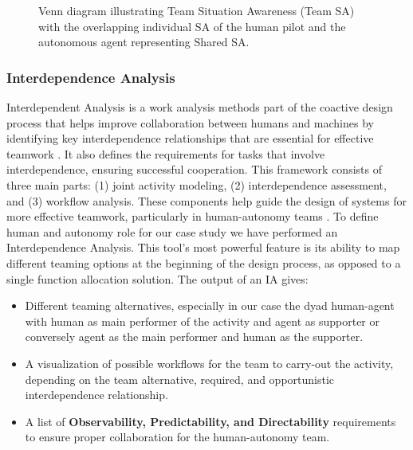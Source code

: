\documentclass[12pt,a4paper]{article} %
\begin{document}
	\begin{figure}[h!]
		\centering
		\caption{Venn diagram illustrating Team Situation Awareness (Team SA) with the overlapping individual SA of the human pilot and the autonomous agent representing Shared SA.}
		\label{fig:team-sa-venn}
	\end{figure}

	\subsubsection{Interdependence Analysis}
	Interdependent Analysis is a work analysis methods part of the coactive design process that helps improve collaboration between humans and machines by identifying key interdependence relationships that are essential for effective teamwork \parencite{johnson_coactive_2014}. It also defines the requirements for tasks that involve interdependence, ensuring successful cooperation. This framework consists of three main parts: (1) joint activity modeling, (2) interdependence assessment, and (3) workflow analysis. These components help guide the design of systems for more effective teamwork, particularly in human-autonomy teams \parencite{johnson_understanding_2018}.
	To define human and autonomy role for our case study we have performed an Interdependence Analysis. This tool's most powerful feature is its ability to map different teaming options at the beginning of the design process, as opposed to a single function allocation solution. The output of an IA gives:
	\begin{itemize}
		\item Different teaming alternatives, especially in our case the dyad human-agent with human as main performer of the activity and agent as supporter or conversely agent as the main performer and human as the supporter.
		\item A visualization of possible workflows for the team to carry-out the activity, depending on the team alternative, required, and opportunistic interdependence relationship.
		\item A list of \textbf{Observability, Predictability, and Directability} requirements to ensure proper collaboration for the human-autonomy team.
	\end{itemize}
\end{document}
